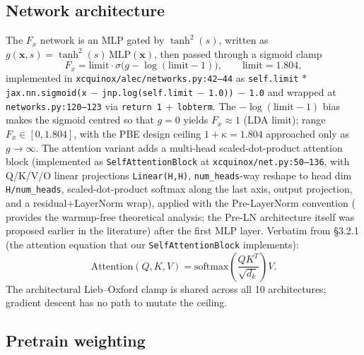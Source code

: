 \documentclass[11pt,letterpaper]{article}
\begin{document}
\subsection{Network architecture}
The $F_x$ network is an MLP gated by $\tanh^2(s)$, written as
$g(\boldsymbol{x},s) = \tanh^2(s)\,\mathrm{MLP}(\boldsymbol{x})$, then passed through a
sigmoid clamp
\begin{equation}
F_x = \mathrm{limit}\cdot \sigma\!\bigl(g - \log(\mathrm{limit}-1)\bigr),
\qquad \mathrm{limit} = 1.804,
\end{equation}
implemented in \texttt{xcquinox/alec/networks.py:42--44} as
\texttt{self.limit$\,*\,$jax.nn.sigmoid(x$\,-\,$jnp.log(self.limit$\,-\,$1.0))$\,-\,$1.0}
and wrapped at \texttt{networks.py:120--123} via \texttt{return 1$\,+\,$lobterm}.
The $-\log(\mathrm{limit}-1)$ bias makes the sigmoid centred so that $g=0$ yields
$F_x \approx 1$ (LDA limit); range $F_x \in [0, 1.804]$, with the PBE design ceiling
$1+\kappa = 1.804$ approached only as $g\to\infty$.
The attention variant adds a multi-head scaled-dot-product attention block
\citep{VaswaniAttention2017} (implemented as
\texttt{SelfAttentionBlock} at
\texttt{xcquinox/net.py:50--136}, with Q/K/V/O linear projections
\texttt{Linear(H,H)}, \texttt{num\_heads}-way reshape to head dim
\texttt{H/num\_heads}, scaled-dot-product softmax along the last
axis, output projection, and a residual+LayerNorm wrap), applied with
the Pre-LayerNorm convention
(\citet{XiongPreLN2020} provides the warmup-free theoretical analysis;
the Pre-LN architecture itself was proposed earlier in the literature)
after the first MLP layer. Verbatim from \citet{VaswaniAttention2017}
\S 3.2.1 (the attention equation that our \texttt{SelfAttentionBlock} implements):
\begin{equation*}
\mathrm{Attention}(Q, K, V) = \mathrm{softmax}\!\left(\frac{Q K^T}{\sqrt{d_k}}\right) V .
\end{equation*}
The architectural Lieb--Oxford clamp is shared across all 10 architectures; gradient
descent has no path to mutate the ceiling.

\subsection{Pretrain weighting}
\end{document}
